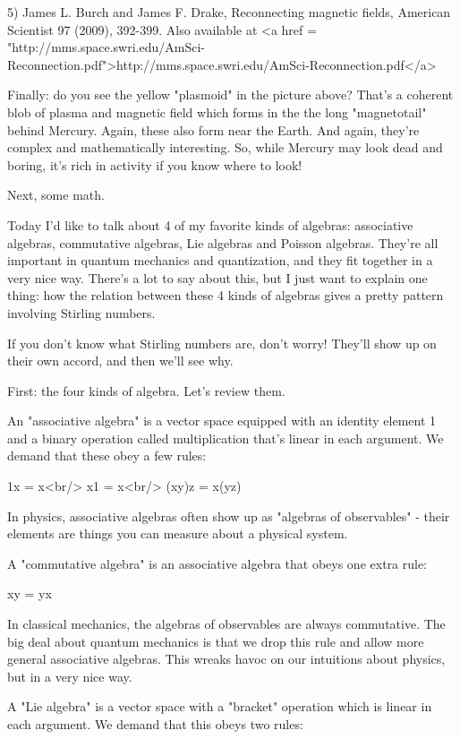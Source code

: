 5) James L. Burch and James F. Drake, Reconnecting magnetic fields,
American Scientist 97 (2009), 392-399.  Also available at
<a href = "http://mms.space.swri.edu/AmSci-Reconnection.pdf">http://mms.space.swri.edu/AmSci-Reconnection.pdf</a>

Finally: do you see the yellow "plasmoid" in
the picture above?  That's a coherent blob of plasma and magnetic
field which forms in the the long "magnetotail" behind
Mercury.  Again, these also form near the Earth.  And again, they're
complex and mathematically interesting.  So, while Mercury may look
dead and boring, it's rich in activity if you know where to look!

Next, some math.

Today I'd like to talk about 4 of my favorite kinds of algebras:
associative algebras, commutative algebras, Lie algebras and Poisson
algebras.  They're all important in quantum mechanics and quantization,
and they fit together in a very nice way.  There's a lot to say about
this, but I just want to explain one thing: how the relation between
these 4 kinds of algebras gives a pretty pattern involving Stirling
numbers.

If you don't know what Stirling numbers are, don't worry!  They'll
show up on their own accord, and then we'll see why.

First: the four kinds of algebra.  Let's review them. 

An "associative algebra" is a vector space equipped with an
identity element 1 and a binary operation called multiplication that's
linear in each argument.  We demand that these obey a few rules:

1x = x<br/>
x1 = x<br/>
(xy)z = x(yz)

In physics, associative algebras often show up as "algebras of
observables" - their elements are things you can measure about a
physical system.

A "commutative algebra" is an associative algebra that obeys
one extra rule:

xy = yx

In classical mechanics, the algebras of observables are always
commutative.  The big deal about quantum mechanics is that we drop
this rule and allow more general associative algebras.  This wreaks
havoc on our intuitions about physics, but in a very nice way.

A "Lie algebra" is a vector space with a "bracket"
operation which is linear in each argument.  We demand that this obeys
two rules:

